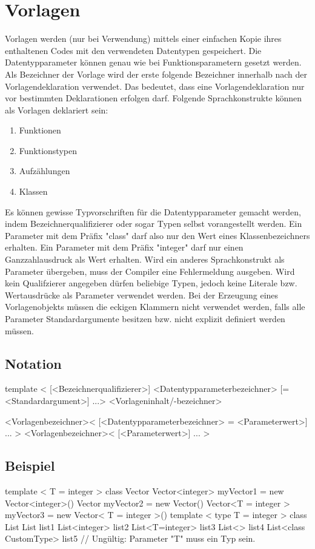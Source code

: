 \chapter{Vorlagen}
Vorlagen werden (nur bei Verwendung) mittels einer einfachen Kopie ihres enthaltenen Codes mit den verwendeten Datentypen gespeichert.
Die Datentypparameter können genau wie bei Funktionsparametern gesetzt werden.
Als Bezeichner der Vorlage wird der erste folgende Bezeichner innerhalb nach der Vorlagendeklaration verwendet.
Das bedeutet, dass eine Vorlagendeklaration nur vor bestimmten Deklarationen erfolgen darf.
Folgende Sprachkonstrukte können als Vorlagen deklariert sein:
\begin{enumerate}
\item Funktionen
\item Funktionstypen
\item Aufzählungen
\item Klassen
\end{enumerate}

Es können gewisse Typvorschriften für die Datentypparameter gemacht werden, indem Bezeichnerqualifizierer oder sogar Typen selbst vorangestellt werden.
Ein Parameter mit dem Präfix "class" darf also nur den Wert eines Klassenbezeichners erhalten.
Ein Parameter mit dem Präfix "integer" darf nur einen Ganzzahlausdruck als Wert erhalten.
Wird ein anderes Sprachkonstrukt als Parameter übergeben, muss der Compiler eine Fehlermeldung ausgeben.
Wird kein Qualifzierer angegeben dürfen beliebige Typen, jedoch keine Literale bzw. Wertausdrücke als Parameter verwendet werden.
Bei der Erzeugung eines Vorlagenobjekts müssen die eckigen Klammern nicht verwendet werden, falls alle Parameter Standardargumente besitzen bzw.
nicht explizit definiert werden müssen.

\section{Notation}
template < [<Bezeichnerqualifizierer>] <Datentypparameterbezeichner> [= <Standardargument>] ...> <Vorlageninhalt/-bezeichner>

<Vorlagenbezeichner>< [<Datentypparameterbezeichner> = <Parameterwert>] ... >
<Vorlagenbezeichner>< [<Parameterwert>] ... >

\section{Beispiel}
template < T = integer > class Vector
Vector<integer> myVector1 = new Vector<integer>()
Vector myVector2 = new Vector()
Vector<T = integer > myVector3 = new Vector< T = integer >()
template < type T = integer > class List {}
List list1
List<integer> list2
List<T=integer> list3
List<> list4
List<class CustomType> list5 // Ungültig: Parameter "T" muss ein Typ sein.
